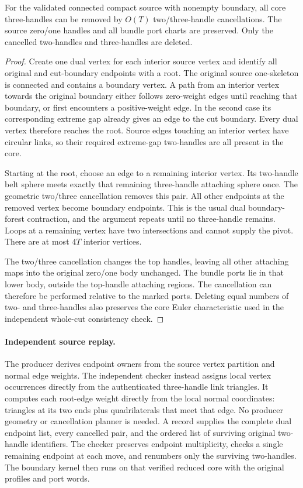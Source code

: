 \begin{proposition}
\label{marked-cut:dual-forest}
For the validated connected compact source with nonempty boundary, all core
three-handles can be removed by $O(T)$ two/three-handle cancellations. The
source zero/one handles and all bundle port charts are preserved. Only the
cancelled two-handles and three-handles are deleted.
\end{proposition}
\begin{proof}
Create one dual vertex for each interior source vertex and identify all
original and cut-boundary endpoints with a root. The original source
one-skeleton is connected and contains a boundary vertex. A path from an
interior vertex towards the original boundary either follows zero-weight
edges until reaching that boundary, or first encounters a positive-weight
edge. In the second case its corresponding extreme gap already gives an
edge to the cut boundary. Every dual vertex therefore reaches the root.
Source edges touching an interior vertex have circular links, so their
required extreme-gap two-handles are all present in the core.

Starting at the root, choose an edge to a remaining interior vertex. Its
two-handle belt sphere meets exactly that remaining three-handle attaching
sphere once. The geometric two/three cancellation removes this pair. All
other endpoints at the removed vertex become boundary endpoints. This is
the usual dual boundary-forest contraction, and the argument repeats until
no three-handle remains. Loops at a remaining vertex have two intersections
and cannot supply the pivot. There are at most $4T$ interior vertices.

The two/three cancellation changes the top handles, leaving all other
attaching maps into the original zero/one body unchanged. The bundle ports
lie in that lower body, outside the top-handle attaching regions. The
cancellation can therefore be performed relative to the marked ports.
Deleting equal numbers of two- and three-handles also preserves the core
Euler characteristic used in the independent whole-cut consistency check.
\end{proof}

\paragraph{Independent source replay.}
The producer derives endpoint owners from the source vertex partition and
normal edge weights. The independent checker instead assigns local vertex
occurrences directly from the authenticated three-handle link triangles.
It computes each root-edge weight directly from the local normal coordinates:
triangles at its two ends plus quadrilaterals that meet that edge. No
producer geometry or cancellation planner is needed. A record supplies the
complete dual endpoint list, every cancelled pair, and the ordered list of
surviving original two-handle identifiers. The checker preserves endpoint
multiplicity, checks a single remaining endpoint at each move, and renumbers
only the surviving two-handles. The boundary kernel then runs on that
verified reduced core with the original profiles and port words.

